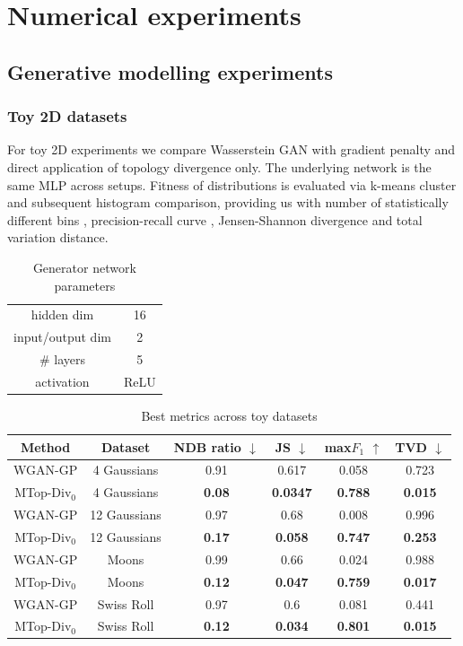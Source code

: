 \chapter{Numerical experiments}
\section{Generative modelling experiments}
\subsection{Toy 2D datasets}
For toy 2D experiments we compare Wasserstein GAN with gradient penalty and direct application of topology divergence only. The underlying network is the same MLP across setups. Fitness of distributions is evaluated via k-means cluster and subsequent histogram comparison, providing us with number of statistically different bins \cite{richardson2018gans}, precision-recall curve \cite{sajjadi2018assessing}, Jensen-Shannon divergence and total variation distance.
\begin{table}[h!]
    \centering
    \begin{tabular}{|c|c|}
    \hline
        hidden dim  & 16 \\
        input/output dim & 2 \\
        \# layers & 5 \\
        activation & ReLU \\
    \hline
    \end{tabular}
    \caption{Generator network parameters}
    \label{tab:my_label}
\end{table}

\begin{table}[h!]
    \centering
    \begin{tabular}{||c|c||c|c|c|c||}
        \hline \hline
         Method & Dataset & NDB ratio $\downarrow$& JS $\downarrow$ & max$F_1$ $\uparrow$ & TVD $\downarrow$\\ \hline \hline
         WGAN-GP & 4 Gaussians  & 0.91 & 0.617 & 0.058 & 0.723 \\ \hline
         MTop-Div${}_0$ & 4 Gaussians  & \textbf{0.08} & \textbf{0.0347} & \textbf{0.788} & \textbf{0.015} \\ \hline \hline
         WGAN-GP & 12 Gaussians  & 0.97 & 0.68 & 0.008 & 0.996 \\ \hline
         MTop-Div${}_0$ & 12 Gaussians  & \textbf{0.17} & \textbf{0.058} & \textbf{0.747} & \textbf{0.253} \\ \hline \hline
         WGAN-GP & Moons  & 0.99 & 0.66 & 0.024 & 0.988\\ \hline
         MTop-Div${}_0$ & Moons  & \textbf{0.12} & \textbf{0.047} & \textbf{0.759} & \textbf{0.017} \\ \hline \hline
         WGAN-GP & Swiss Roll  & 0.97 & 0.6 & 0.081 & 0.441 \\ \hline
         MTop-Div${}_0$ & Swiss Roll  & \textbf{0.12} & \textbf{0.034} & \textbf{0.801} & \textbf{0.015} \\ \hline
        \hline
    \end{tabular}
    \caption{Best metrics across toy datasets}
    \label{tab:my_label}
\end{table}

